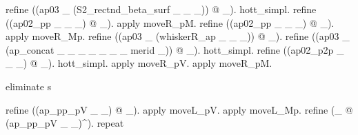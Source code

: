 \begin{coqdoccode}
\begin{coqdoccomment}
\coqdoceol
\coqdocindent{1.00em}
refine\coqdocindent{0.50em}
((ap03\coqdocindent{0.50em}
\_\coqdocindent{0.50em}
(S2\_rectnd\_beta\_surf\coqdocindent{0.50em}
\_\coqdocindent{0.50em}
\_\coqdocindent{0.50em}
\_))\coqdocindent{0.50em}
@\coqdocindent{0.50em}
\_).\coqdoceol
\coqdocindent{1.00em}
hott\_simpl.\coqdoceol
\coqdocindent{1.00em}
refine\coqdocindent{0.50em}
((ap02\_pp\coqdocindent{0.50em}
\_\coqdocindent{0.50em}
\_\coqdocindent{0.50em}
\_)\coqdocindent{0.50em}
@\coqdocindent{0.50em}
\_).\coqdocindent{0.50em}
apply\coqdocindent{0.50em}
moveR\_pM.\coqdoceol
\coqdocindent{1.00em}
refine\coqdocindent{0.50em}
((ap02\_pp\coqdocindent{0.50em}
\_\coqdocindent{0.50em}
\_\coqdocindent{0.50em}
\_)\coqdocindent{0.50em}
@\coqdocindent{0.50em}
\_).\coqdocindent{0.50em}
apply\coqdocindent{0.50em}
moveR\_Mp.\coqdoceol
\coqdocindent{1.00em}
refine\coqdocindent{0.50em}
((ap03\coqdocindent{0.50em}
\_\coqdocindent{0.50em}
(whiskerR\_ap\coqdocindent{0.50em}
\_\coqdocindent{0.50em}
\_\coqdocindent{0.50em}
\_))\coqdocindent{0.50em}
@\coqdocindent{0.50em}
\_).\coqdoceol
\coqdocindent{1.00em}
refine\coqdocindent{0.50em}
((ap03\coqdocindent{0.50em}
\_\coqdocindent{0.50em}
(ap\_concat\coqdocindent{0.50em}
\_\coqdocindent{0.50em}
\_\coqdocindent{0.50em}
\_\coqdocindent{0.50em}
\_\coqdocindent{0.50em}
\_\coqdocindent{0.50em}
\_\coqdocindent{0.50em}
\_\coqdocindent{0.50em}
merid\coqdocindent{0.50em}
\_))\coqdocindent{0.50em}
@\coqdocindent{0.50em}
\_).\coqdoceol
\coqdocindent{1.00em}
hott\_simpl.\coqdoceol
\coqdocindent{1.00em}
refine\coqdocindent{0.50em}
((ap02\_p2p\coqdocindent{0.50em}
\_\coqdocindent{0.50em}
\_\coqdocindent{0.50em}
\_)\coqdocindent{0.50em}
@\coqdocindent{0.50em}
\_).\coqdocindent{0.50em}
hott\_simpl.\coqdocindent{0.50em}
apply\coqdocindent{0.50em}
moveR\_pV.\coqdocindent{0.50em}
apply\coqdocindent{0.50em}
moveR\_pM.\coqdoceol
\coqdoceol
\coqdocindent{1.00em}
\begin{coqdoccomment}
\coqdocindent{0.50em}
eliminate\coqdocindent{0.50em}
s\coqdocindent{0.50em}
\end{coqdoccomment}
\coqdoceol
\coqdocindent{1.00em}
refine\coqdocindent{0.50em}
((ap\_pp\_pV\coqdocindent{0.50em}
\_\coqdocindent{0.50em}
\_)\coqdocindent{0.50em}
@\coqdocindent{0.50em}
\_).\coqdocindent{0.50em}
apply\coqdocindent{0.50em}
moveL\_pV.\coqdocindent{0.50em}
apply\coqdocindent{0.50em}
moveL\_Mp.\coqdoceol
\coqdocindent{1.00em}
refine\coqdocindent{0.50em}
(\_\coqdocindent{0.50em}
@\coqdocindent{0.50em}
(ap\_pp\_pV\coqdocindent{0.50em}
\_\coqdocindent{0.50em}
\_)\^{}).\coqdocindent{0.50em}
repeat\coqdocindent{0.50em}

\end{coqdoccomment}
\end{coqdoccode}
